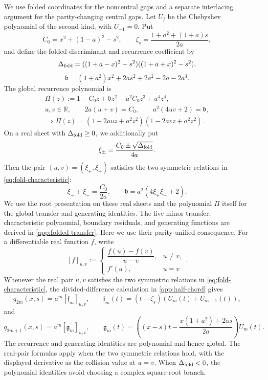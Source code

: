 \documentclass[11pt,a4paper]{article}
\numberwithin{equation}{section}
\begin{document}
We use folded coordinates for the noncentral gaps and a separate
interlacing argument for the parity-changing central gaps.
Let \(U_j\) be the Chebyshev polynomial of the second kind, with
\(U_{-1}=0\).  Put
\[
 C_0=x^2+(1-a)^2-s^2,\qquad
 \zeta_s=\frac{1+a^2+(1+a)s}{2a},
\]
and define the folded discriminant and recurrence coefficient by
\[
 \Delta_{\rm fold}=((1+a-x)^2-s^2)((1+a+x)^2-s^2),
\]
\[
 \mathfrak b=(1+a^2)x^2+2as^2+2a^2-2a-2a^3.
\]
The global recurrence polynomial is
\begin{equation}\label{eq:fold-characteristic}
\begin{gathered}
 \Pi(z):=1-C_0z+\mathfrak b z^2-a^2C_0z^3+a^4z^4,\\
 u,v\in\mathbb R,\qquad
 2a(u+v)=C_0,\qquad a^2(4uv+2)=\mathfrak b,\\
 \Longrightarrow
 \Pi(z)=(1-2auz+a^2z^2)(1-2avz+a^2z^2).
\end{gathered}
\end{equation}
On a real sheet with \(\Delta_{\rm fold}\geq0\), we additionally put
\[
 \xi_\pm=\frac{C_0\pm\sqrt{\Delta_{\rm fold}}}{4a}.
\]
Then the pair \((u,v)=(\xi_+,\xi_-)\) satisfies the two symmetric
relations in \eqref{eq:fold-characteristic}:
\[
 \xi_++\xi_-=\frac{C_0}{2a},\qquad
 \mathfrak b=a^2(4\xi_+\xi_-+2).
\]
We use the root presentation on these real sheets and the polynomial
\(\Pi\) itself for the global transfer and generating identities.
The five-minor transfer, characteristic polynomial, boundary residuals, and
generating functions are derived in \cref{app:folded-transfer}.  Here we use
their parity-unified consequence.  For a differentiable real function \(f\),
write
\[
 [f]_{u,v}:=
 \begin{cases}
  \dfrac{f(u)-f(v)}{u-v},&u\neq v,\\[2mm]
  f'(u),&u=v
 \end{cases}.
\]
Whenever the real pair \(u,v\) satisfies the two symmetric relations in
\eqref{eq:fold-characteristic}, the divided-difference calculation in
\cref{app:half-chord} gives
\begin{equation}\label{eq:fold-even}
 q_{2m}(x,s)=a^m[\mathfrak f_m]_{u,v},\qquad
 \mathfrak f_m(t)=(t-\zeta_s)(U_m(t)+U_{m-1}(t)),
\end{equation}
and
\begin{equation}\label{eq:fold-odd}
 q_{2m+1}(x,s)=a^m[\mathfrak g_m]_{u,v},\qquad
 \mathfrak g_m(t)=\left((x-s)t-
 \frac{x(1+a^2)+2as}{2a}\right)U_m(t).
\end{equation}
The recurrence and generating identities are polynomial and hence global.
The real-pair formulas apply when the two symmetric relations hold, with the
displayed derivative as the collision value at \(u=v\).  When
\(\Delta_{\rm fold}<0\), the polynomial identities avoid choosing a complex
square-root branch.
\end{document}
